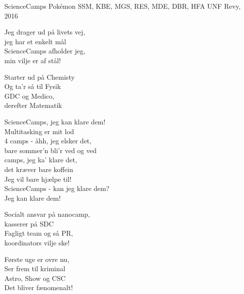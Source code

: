 \begin{song}{ScienceCamps}
  {} %
  {Pokémon} %
  {SSM, KBE, MGS, RES, MDE, DBR, HFA} %
  {UNF Revy, 2016} %
  {\NotCCLIed} %

  \begin{SBVerse}
    Jeg drager ud på livets vej,\\
    jeg har et enkelt mål\\
    ScienceCamps afholder jeg,\\
    min vilje er af stål!
  \end{SBVerse}

  \begin{SBVerse}
    Starter ud på Chemisty\\
    Og ta’r så til Fysik\\
    GDC og Medico,\\
    derefter Matematik
  \end{SBVerse}

  \begin{SBChorus}
    ScienceCamps, jeg kan klare dem!\\
    Multitasking er mit lod\\
    4 camps - åhh, jeg elsker det,\\
    bare sommer’n bli’r ved og ved\\ camps, jeg ka’ klare det,\\
    det kræver bare koffein\\
    Jeg vil bare hjælpe til!\\
    ScienceCamps - kan jeg klare dem?\\
    Jeg kan klare dem!
  \end{SBChorus}

  \begin{SBVerse}
    Socialt ansvar på nanocamp,\\
    kasserer på SDC\\
    Fagligt team og så PR,\\
    koordinators vilje ske!
  \end{SBVerse}

  \begin{SBVerse}
    Første uge er ovre nu,\\
    Ser frem til kriminal\\
    Astro, Show og CSC\\
    Det bliver fænomenalt!
  \end{SBVerse}


\end{song}
